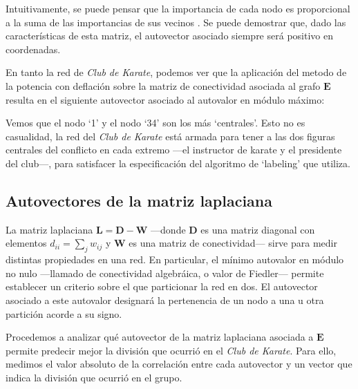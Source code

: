\vspace{1em}
Intuitivamente, se puede pensar que la importancia de cada nodo es proporcional a la suma de las importancias de sus vecinos . Se puede demostrar  que, dado las características de esta matriz, el autovector asociado siempre será positivo en coordenadas.

\vspace{1em}
En tanto la red de \textit{Club de Karate}, podemos ver que la aplicación del metodo de la potencia con deflación sobre la matriz de conectividad asociada al grafo $\mathbf{E}$ resulta en el siguiente autovector asociado al autovalor en módulo máximo:

\vspace{1em}

\vspace{1em}
Vemos que el nodo `1' y el nodo `34' son los más `centrales'. Esto no es casualidad, la red del \textit{Club de Karate} está armada para tener a las dos figuras centrales del conflicto en cada extremo ---el instructor de karate y el presidente del club---, para satisfacer la especificación del algoritmo de `labeling' que utiliza.





\vspace{2em}
\subsection{Autovectores de la matriz laplaciana} La matriz laplaciana $\mathbf{L} = \mathbf{D} - \mathbf{W}$ ---donde \textbf{D} es una matriz diagonal con elementos $d_{ii} = \sum_j w_{ij}$ y \textbf{W} es una matriz de conectividad--- sirve para medir distintas propiedades en una red. En particular, el mínimo autovalor en módulo no nulo ---llamado de conectividad algebráica, o valor de Fiedler--- permite establecer un criterio sobre el que particionar la red en dos. El autovector asociado a este autovalor designará la pertenencia de un nodo a una u otra partición acorde a su signo. 

\vspace{1em}
Procedemos a analizar qué autovector de la matriz laplaciana asociada a $\mathbf{E}$ permite predecir mejor la división que ocurrió en el \textit{Club de Karate}. Para ello, medimos el valor absoluto de la correlación entre cada autovector y un vector que indica la división que ocurrió en el grupo.

\vspace{1em}
